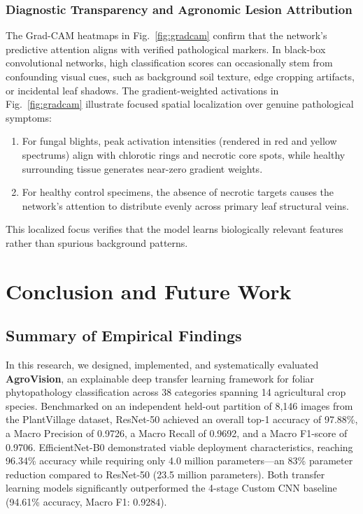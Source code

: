 \documentclass[journal]{IEEEtran}
\begin{document}
\subsubsection{Diagnostic Transparency and Agronomic Lesion Attribution}
The Grad-CAM heatmaps in Fig.~\ref{fig:gradcam} confirm that the network's predictive attention aligns with verified pathological markers. In black-box convolutional networks, high classification scores can occasionally stem from confounding visual cues, such as background soil texture, edge cropping artifacts, or incidental leaf shadows. The gradient-weighted activations in Fig.~\ref{fig:gradcam} illustrate focused spatial localization over genuine pathological symptoms:
\begin{enumerate}
    \item For fungal blights, peak activation intensities (rendered in red and yellow spectrums) align with chlorotic rings and necrotic core spots, while healthy surrounding tissue generates near-zero gradient weights.
    \item For healthy control specimens, the absence of necrotic targets causes the network's attention to distribute evenly across primary leaf structural veins.
\end{enumerate}
This localized focus verifies that the model learns biologically relevant features rather than spurious background patterns.

\section{Conclusion and Future Work}

\subsection{Summary of Empirical Findings}
In this research, we designed, implemented, and systematically evaluated \textbf{AgroVision}, an explainable deep transfer learning framework for foliar phytopathology classification across 38 categories spanning 14 agricultural crop species. Benchmarked on an independent held-out partition of 8,146 images from the PlantVillage dataset, ResNet-50 achieved an overall top-1 accuracy of 97.88\%, a Macro Precision of 0.9726, a Macro Recall of 0.9692, and a Macro F1-score of 0.9706. EfficientNet-B0 demonstrated viable deployment characteristics, reaching 96.34\% accuracy while requiring only 4.0 million parameters—an 83\% parameter reduction compared to ResNet-50 (23.5 million parameters). Both transfer learning models significantly outperformed the 4-stage Custom CNN baseline (94.61\% accuracy, Macro F1: 0.9284).
\end{document}
